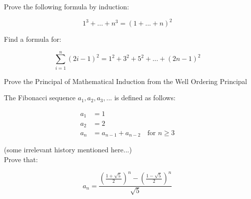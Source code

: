 \documentclass[12pt,letterpaper]{hmcpset}
\begin{document}

\begin{problem}[2.1.ii]
    Prove the following formula by induction:

    \[1^3+...+n^3 = \left( 1+...+n \right)^2\]
\end{problem}

\begin{solution}

\end{solution}

\begin{problem}[2.2.ii]
    Find a formula for:

    \[\sum_{i=1}^n \left( 2i-1 \right)^2 = 1^2 + 3^2 + 5^2 + ... + \left( 2n-1 \right)^2\]
\end{problem}

\begin{solution}

\end{solution}

\begin{problem}[2.10]
   Prove the Principal of Mathematical Induction from the Well Ordering Principal 
\end{problem}

\begin{solution}

\end{solution}

\begin{problem}[2.20]
    The Fibonacci sequence \(a_1,a_2,a_3,...\) is defined as follows:

    \begin{align*}
        a_1 &= 1\\
        a_2 &= 2\\
        a_n &= a_{n-1} + a_{n-2} \quad \text{for } n \ge 3
    \end{align*}

    (some irrelevant history mentioned here...)\\

    Prove that:

    \[ a_n = \frac{\left(\frac{1+\sqrt{5}}{2}\right)^n - \left(\frac{1-\sqrt{5}}{2}\right)^n}{\sqrt{5}} \]
\end{problem}

\begin{solution}

\end{solution}
\end{document}
